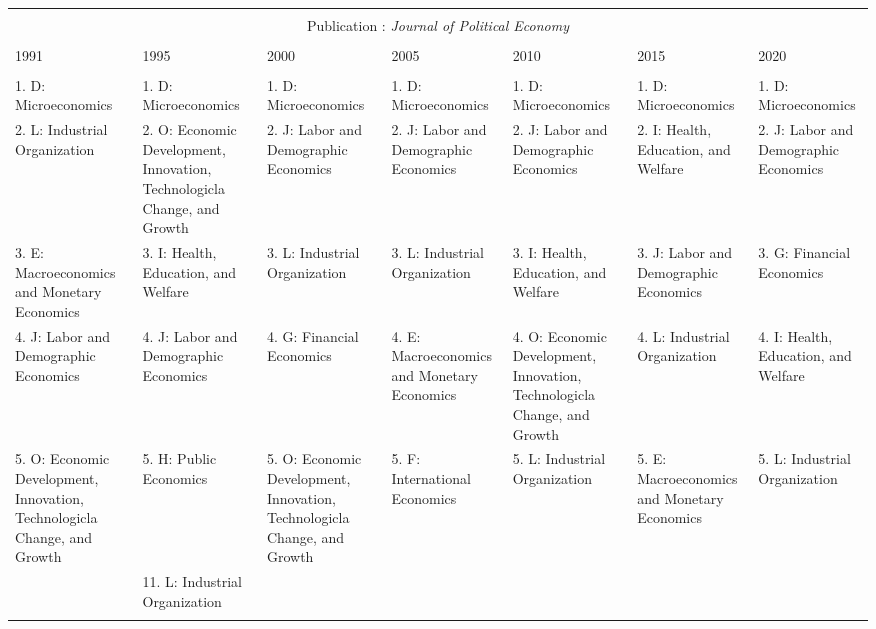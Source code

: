 
\begin{table}[h] \centering 
  \caption{} 
  \label{} 
\begin{tabular}{@{\extracolsep{5pt}} lllllll} 
\\[-1.8ex]\hline 
\hline \\[-1.8ex] \multicolumn{7}{c}{Publication : \textit{Journal of Political Economy}} \\
 \cline{1-7} \\
1991 & 1995 & 2000 & 2005 & 2010 & 2015 & 2020 \\ 
\hline \\[-1.8ex] 
1. D: Microeconomics & 1. D: Microeconomics & 1. D: Microeconomics & 1. D: Microeconomics & 1. D: Microeconomics & 1. D: Microeconomics & 1. D: Microeconomics \\ 
2. L: Industrial Organization & 2. O: Economic Development, Innovation, Technologicla Change, and Growth & 2. J: Labor and Demographic Economics & 2. J: Labor and Demographic Economics & 2. J: Labor and Demographic Economics & 2. I: Health, Education, and Welfare & 2. J: Labor and Demographic Economics \\ 
3. E: Macroeconomics and Monetary Economics & 3. I: Health, Education, and Welfare & 3. L: Industrial Organization & 3. L: Industrial Organization & 3. I: Health, Education, and Welfare & 3. J: Labor and Demographic Economics & 3. G: Financial Economics \\ 
4. J: Labor and Demographic Economics & 4. J: Labor and Demographic Economics & 4. G: Financial Economics & 4. E: Macroeconomics and Monetary Economics & 4. O: Economic Development, Innovation, Technologicla Change, and Growth & 4. L: Industrial Organization & 4. I: Health, Education, and Welfare \\ 
5. O: Economic Development, Innovation, Technologicla Change, and Growth & 5. H: Public Economics & 5. O: Economic Development, Innovation, Technologicla Change, and Growth & 5. F: International Economics & 5. L: Industrial Organization & 5. E: Macroeconomics and Monetary Economics & 5. L: Industrial Organization \\ 
 & 11. L: Industrial Organization &  &  &  &  &  \\ 
\hline \\[-1.8ex] 
\end{tabular} 
\end{table} 
